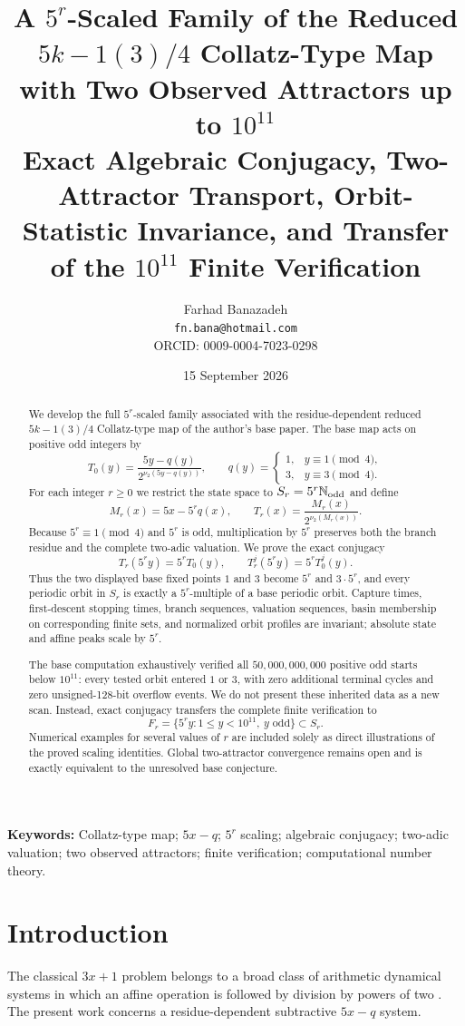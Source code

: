 \documentclass[11pt]{article}
\title{A $5^r$-Scaled Family of the Reduced $5k-1(3)/4$ Collatz-Type Map with Two Observed Attractors up to $10^{11}$\\[4pt]
\large Exact Algebraic Conjugacy, Two-Attractor Transport, Orbit-Statistic Invariance, and Transfer of the $10^{11}$ Finite Verification}
\author{Farhad Banazadeh\\\texttt{fn.bana@hotmail.com}\\ORCID: 0009-0004-7023-0298}
\date{15 September 2026}
\theoremstyle{remark}\newtheorem{remark}{Remark}
\newcommand{\Nodd}{\mathbb{N}_{\rm odd}}
\begin{document}
\maketitle
\begin{abstract}
We develop the full $5^r$-scaled family associated with the residue-dependent reduced $5k-1(3)/4$ Collatz-type map of the author's base paper.  The base map acts on positive odd integers by
\[
T_0(y)=\frac{5y-q(y)}{2^{\nu_2(5y-q(y))}},\qquad
q(y)=\begin{cases}1,&y\equiv1\pmod4,\\3,&y\equiv3\pmod4.\end{cases}
\]
For each integer $r\ge0$ we restrict the state space to $S_r=5^r\Nodd$ and define
\[
M_r(x)=5x-5^r q(x),\qquad
T_r(x)=\frac{M_r(x)}{2^{\nu_2(M_r(x))}}.
\]
Because $5^r\equiv1\pmod4$ and $5^r$ is odd, multiplication by $5^r$ preserves both the branch residue and the complete two-adic valuation.  We prove the exact conjugacy
\[
T_r(5^r y)=5^rT_0(y),\qquad T_r^j(5^r y)=5^rT_0^j(y).
\]
Thus the two displayed base fixed points $1$ and $3$ become $5^r$ and $3\cdot5^r$, and every periodic orbit in $S_r$ is exactly a $5^r$-multiple of a base periodic orbit. Capture times, first-descent stopping times, branch sequences, valuation sequences, basin membership on corresponding finite sets, and normalized orbit profiles are invariant; absolute state and affine peaks scale by $5^r$.

The base computation exhaustively verified all $50,000,000,000$ positive odd starts below $10^{11}$: every tested orbit entered $1$ or $3$, with zero additional terminal cycles and zero unsigned-128-bit overflow events.  We do not present these inherited data as a new scan.  Instead, exact conjugacy transfers the complete finite verification to
\[
F_r=\{5^r y:1\le y<10^{11},\ y\text{ odd}\}\subset S_r.
\]
Numerical examples for several values of $r$ are included solely as direct illustrations of the proved scaling identities.  Global two-attractor convergence remains open and is exactly equivalent to the unresolved base conjecture.
\end{abstract}

\noindent\textbf{Keywords:} Collatz-type map; $5x-q$; $5^r$ scaling; algebraic conjugacy; two-adic valuation; two observed attractors; finite verification; computational number theory.

\section{Introduction}
The classical $3x+1$ problem belongs to a broad class of arithmetic dynamical systems in which an affine operation is followed by division by powers of two \cite{Lagarias,MatthewsWatts,Carnielli}.  The present work concerns a residue-dependent subtractive $5x-q$ system.
\end{document}
